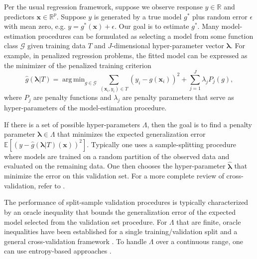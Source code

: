 \documentclass[12pt]{article} %
\theoremstyle{definition}
\DeclareMathOperator*{\argmin}{arg\,min}
\begin{document}
Per the usual regression framework, suppose we observe response $y \in \mathbb{R}$ and predictors $\boldsymbol {x} \in \mathbb{R}^p$. Suppose $y$ is generated by a true model $g^*$ plus random error $\epsilon$ with mean zero, e.g.
$y = g^*(\boldsymbol x) + \epsilon$.
Our goal is to estimate $g^*$.
Many model-estimation procedures can be formulated as selecting a model from some function class $\mathcal{G}$ given training data $T$ and $J$-dimensional hyper-parameter vector $\boldsymbol{\lambda}$. For example, in penalized regression problems, the fitted model can be expressed as the minimizer of the penalized training criterion
\begin{equation}
\label{eq:intro_pen_reg}
\hat{g}(\boldsymbol \lambda | T) = \argmin_{g\in \mathcal{G}} \sum_{(\boldsymbol{x}_i, y_i) \in T} \left (y_i -  g(\boldsymbol{x}_i) \right )^2 + \sum_{j=1}^J \lambda_j P_j(g),
\end{equation}
where $P_j$ are penalty functions and $\lambda_j$ are penalty parameters that serve as hyper-parameters of the model-estimation procedure.

If there is a set of possible hyper-parameters $\Lambda$, then the goal is to find a penalty parameter $\boldsymbol{\lambda} \in \Lambda$ that minimizes the expected generalization error
$
\mathbb{E} \left [
\left ( y - \hat{g}(\boldsymbol{\lambda} | T)(\boldsymbol{x}) \right )^2
\right ].
$
Typically one uses a sample-splitting procedure where models are trained on a random partition of the observed data and evaluated on the remaining data.
One then chooses the hyper-parameter $\hat{\boldsymbol{\lambda}}$ that minimize the error on this validation set.
For a more complete review of cross-validation, refer to \citet{arlot2010survey}.

The performance of split-sample validation procedures is typically characterized by an oracle inequality that bounds the generalization error of the expected model selected from the validation set procedure. For $\Lambda$ that are finite, oracle inequalities have been established for a single training/validation split \citep{gyorfi2006distribution} and a general cross-validation framework \citep{van2003unified, van2004asymptotic}. To handle $\Lambda$ over a continuous range, one can use entropy-based approaches \citep{lecue2012oracle}.
\end{document}
